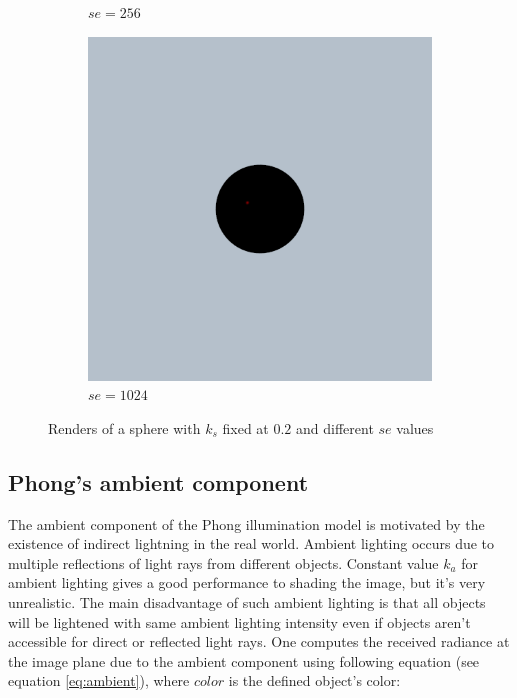 \documentclass{article}
\begin{document}
\begin{figure}[h!]
\begin{subfigure}{0.2\textwidth}
		\caption{$se = 256$}
		\label{fig:specular_0_2_256}
	\end{subfigure}%
	\hfill
	\begin{subfigure}{0.2\textwidth}
		\includegraphics[width=\textwidth]{specular_sc_0_2_se_1024}
		\caption{$se = 1024$}
		\label{fig:specular_0_2_1024}
	\end{subfigure}%
	\hfill
	
	\caption{Renders of a sphere with $k_{s}$ fixed at $0.2$ and different $se$ values}
	\label{fig:specular_0_2}
\end{figure}

\newpage

\subsection*{Phong's ambient component}
The ambient component of the Phong illumination model is motivated by the existence of indirect lightning in the real world. Ambient lighting occurs due to multiple reflections of light rays from different objects. Constant value $k_{a}$ for ambient lighting gives a good performance to shading the image, but it's very unrealistic. The main disadvantage of such ambient lighting is that all objects will be lightened with same ambient lighting intensity even if objects aren't accessible for direct or reflected light rays. One computes the received radiance at the image plane due to the ambient component using following equation (see equation \ref{eq:ambient}), where $color$ is the defined object's color:
\end{document}

